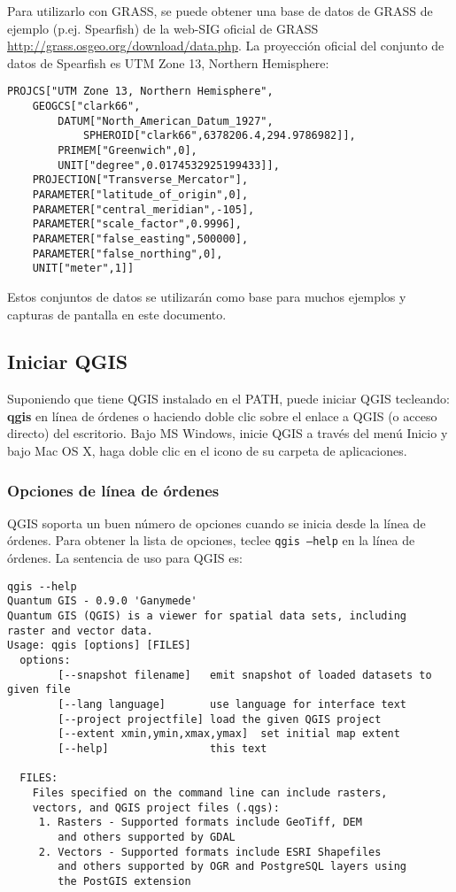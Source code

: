 Para utilizarlo con GRASS, se puede obtener una base de datos de GRASS de ejemplo (p.ej. Spearfish) 
de la web-SIG oficial de GRASS \url{http://grass.osgeo.org/download/data.php}. 
La proyección oficial del conjunto de datos de Spearfish es UTM Zone 13, Northern Hemisphere: 

\begin{verbatim}
PROJCS["UTM Zone 13, Northern Hemisphere",
    GEOGCS["clark66",
        DATUM["North_American_Datum_1927",
            SPHEROID["clark66",6378206.4,294.9786982]],
        PRIMEM["Greenwich",0],
        UNIT["degree",0.0174532925199433]],
    PROJECTION["Transverse_Mercator"],
    PARAMETER["latitude_of_origin",0],
    PARAMETER["central_meridian",-105],
    PARAMETER["scale_factor",0.9996],
    PARAMETER["false_easting",500000],
    PARAMETER["false_northing",0],
    UNIT["meter",1]]
\end{verbatim}

Estos conjuntos de datos se utilizarán como base para muchos ejemplos y 
capturas de pantalla en este documento.

\subsection{Iniciar QGIS}\label{label_startinqgis}

Suponiendo que tiene QGIS instalado en el PATH, puede iniciar QGIS tecleando:
\textbf{qgis} en línea de órdenes o haciendo doble clic sobre el enlace a QGIS 
(o acceso directo) del escritorio. Bajo MS Windows, inicie QGIS a través 
del menú Inicio y bajo Mac OS X, haga doble clic en el icono de su carpeta de aplicaciones.

\subsubsection{Opciones de línea de órdenes}
\label{label_commandline}

QGIS soporta un buen número de opciones cuando se inicia desde la línea de 
órdenes. Para obtener la lista de opciones, teclee \texttt{qgis ---help} en la
línea de órdenes.
La sentencia de uso para QGIS es:

\small
\begin{verbatim}
qgis --help
Quantum GIS - 0.9.0 'Ganymede'
Quantum GIS (QGIS) is a viewer for spatial data sets, including
raster and vector data.
Usage: qgis [options] [FILES]
  options:
        [--snapshot filename]   emit snapshot of loaded datasets to given file
        [--lang language]       use language for interface text
        [--project projectfile] load the given QGIS project
        [--extent xmin,ymin,xmax,ymax]  set initial map extent
        [--help]                this text

  FILES:
    Files specified on the command line can include rasters,
    vectors, and QGIS project files (.qgs):
     1. Rasters - Supported formats include GeoTiff, DEM
        and others supported by GDAL
     2. Vectors - Supported formats include ESRI Shapefiles
        and others supported by OGR and PostgreSQL layers using
        the PostGIS extension
\end{verbatim}
\normalsize

